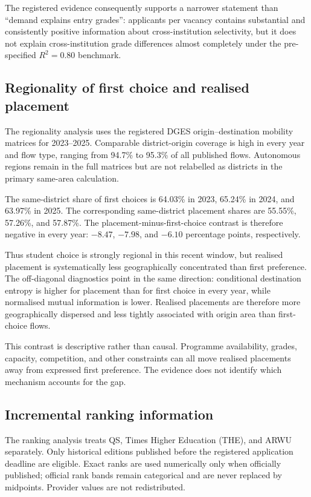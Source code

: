 The registered evidence consequently supports a narrower statement than ``demand explains entry grades'': applicants per vacancy contains substantial and consistently positive information about cross-institution selectivity, but it does not explain cross-institution grade differences almost completely under the pre-specified $R^2=0.80$ benchmark.

\subsection{Regionality of first choice and realised placement}

The regionality analysis uses the registered DGES origin--destination mobility matrices for 2023--2025. Comparable district-origin coverage is high in every year and flow type, ranging from 94.7\% to 95.3\% of all published flows. Autonomous regions remain in the full matrices but are not relabelled as districts in the primary same-area calculation.

The same-district share of first choices is 64.03\% in 2023, 65.24\% in 2024, and 63.97\% in 2025. The corresponding same-district placement shares are 55.55\%, 57.26\%, and 57.87\%. The placement-minus-first-choice contrast is therefore negative in every year: $-8.47$, $-7.98$, and $-6.10$ percentage points, respectively.

Thus student choice is strongly regional in this recent window, but realised placement is systematically less geographically concentrated than first preference. The off-diagonal diagnostics point in the same direction: conditional destination entropy is higher for placement than for first choice in every year, while normalised mutual information is lower. Realised placements are therefore more geographically dispersed and less tightly associated with origin area than first-choice flows.

This contrast is descriptive rather than causal. Programme availability, grades, capacity, competition, and other constraints can all move realised placements away from expressed first preference. The evidence does not identify which mechanism accounts for the gap.

\subsection{Incremental ranking information}

The ranking analysis treats QS, Times Higher Education (THE), and ARWU separately. Only historical editions published before the registered application deadline are eligible. Exact ranks are used numerically only when officially published; official rank bands remain categorical and are never replaced by midpoints. Provider values are not redistributed.

